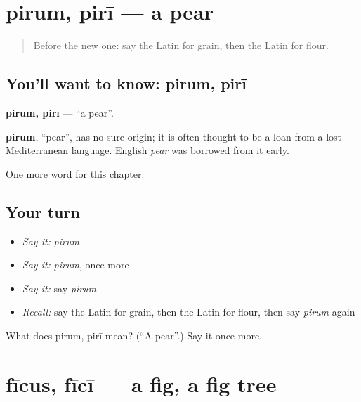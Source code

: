 \section[pirum, pirī]{pirum, pirī — a pear}

\label{lesson:LA-C81-pirum}



\begin{quote}
Before the new one: say the Latin for grain, then the Latin for flour.
\end{quote}

\subsection*{You'll want to know: pirum, pirī}
\textbf{pirum, pirī} — \textquotedblleft{}a pear\textquotedblright{}.

\begin{cousinweb}
\textbf{pirum}, \textquotedblleft{}pear\textquotedblright{}, has no sure origin; it is often thought to be a loan from a lost Mediterranean language. English \emph{pear} was borrowed from it early.
\end{cousinweb}

\begin{grammarlens}[title={What you've built}]
One more word for this chapter.
\end{grammarlens}

\subsection*{Your turn}
\begin{itemize}
\raggedright
  \item \emph{Say it:} \emph{pirum}
  \item \emph{Say it:} \emph{pirum}, once more
  \item \emph{Say it:} say \emph{pirum}
  \item \emph{Recall:} say the Latin for grain, then the Latin for flour, then say \emph{pirum} again
\end{itemize}

\begin{tcolorbox}[breakable,colback=teal!4,colframe=teal!35!black,title={Before you move on}]
What does pirum, pirī mean? (\textquotedblleft{}A pear\textquotedblright{}.) Say it once more.
\end{tcolorbox}
\section[fīcus, fīcī]{fīcus, fīcī — a fig, a fig tree}

